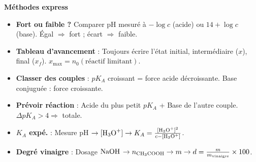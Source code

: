 \documentclass[11pt]{article}
\begin{document}
\begin{bilan}
\textbf{Méthodes express}
\begin{itemize}\setlength{\itemsep}{1pt}
  \item \textbf{Fort ou faible ?} Comparer pH mesuré à $-\log c$ (acide) ou $14+\log c$ (base). Égal $\Rightarrow$ fort ; écart $\Rightarrow$ faible.
  \item \textbf{Tableau d'avancement} : Toujours écrire l'état initial, intermédiaire ($x$), final ($x_f$). $x_{\max} = n_0(\text{réactif limitant})$.
  \item \textbf{Classer des couples} : $pK_A$ croissant = force acide décroissante. Base conjuguée : force croissante.
  \item \textbf{Prévoir réaction} : Acide du plus petit $pK_A$ + Base de l'autre couple. $\Delta pK_A > 4 \Rightarrow$ totale.
  \item \textbf{$K_A$ expé.} : Mesure pH $\to [\ce{H3O+}] \to K_A = \frac{[\ce{H3O+}]^2}{c-[\ce{H3O+}]}$.
  \item \textbf{Degré vinaigre} : Dosage $\ce{NaOH}$ $\to n_{\ce{CH3COOH}} \to m \to d = \frac{m}{m_{\text{vinaigre}}}\times 100$.
\end{itemize}
\end{bilan}
\end{document}

